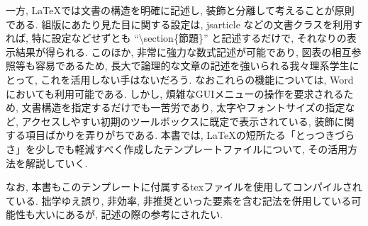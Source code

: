 一方, \LaTeX では文書の構造を明確に記述し, 装飾と分離して考えることが原則である.
組版にあたり見た目に関する設定は, jsarticle などの文書クラスを利用すれば, 特に設定などせずとも ``\textbackslash section\{節題\}'' と記述するだけで, それなりの表示結果が得られる.
このほか, 非常に強力な数式記述が可能であり, 図表の相互参照等も容易であるため, 長大で論理的な文章の記述を強いられる我々理系学生にとって, これを活用しない手はないだろう.
なおこれらの機能については, Word においても利用可能である. しかし, 煩雑なGUIメニューの操作を要求されるため, 文書構造を指定するだけでも一苦労であり, 太字やフォントサイズの指定など,
アクセスしやすい初期のツールボックスに既定で表示されている, 装飾に関する項目ばかりを弄りがちである.
本書では, \LaTeX の短所たる「とっつきづらさ」を少しでも軽減すべく作成したテンプレートファイルについて, その活用方法を解説していく.

なお, 本書もこのテンプレートに付属するtexファイルを使用してコンパイルされている. 拙学ゆえ誤り, 非効率, 非推奨といった要素を含む記法を併用している可能性も大いにあるが, 記述の際の参考にされたい.
